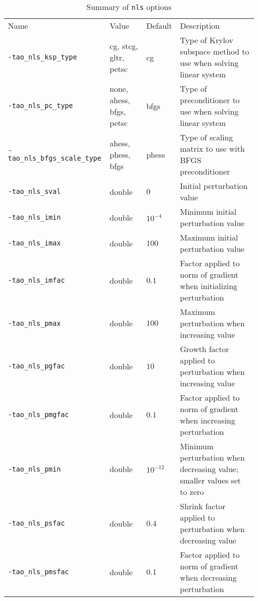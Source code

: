 \begin{table}[h]
\caption{Summary of {\tt nls} options}
\begin{tabular}{l|p{1.5in}|l|p{2.0in}}
Name & Value & Default & Description \\
{\tt -tao\_nls\_ksp\_type} & cg, stcg, gltr, petsc & cg & Type of Krylov subspace method to use when solving linear system \\
{\tt -tao\_nls\_pc\_type} & none, ahess, bfgs, petsc & bfgs & Type of preconditioner to use when solving linear system \\
{\tt -tao\_nls\_bfgs\_scale\_type} & ahess, phess, bfgs & phess & Type of scaling matrix to use with BFGS preconditioner \\
{\tt -tao\_nls\_sval} & double & $0$ & Initial perturbation value \\
{\tt -tao\_nls\_imin} & double & $10^{-4}$ & Minimum initial perturbation value \\
{\tt -tao\_nls\_imax} & double & $100$ & Maximum initial perturbation value \\
{\tt -tao\_nls\_imfac} & double & $0.1$ & Factor applied to norm of gradient when initializing perturbation \\
{\tt -tao\_nls\_pmax} & double & $100$ & Maximum perturbation when increasing value \\
{\tt -tao\_nls\_pgfac} & double & $10$ & Growth factor applied to perturbation when increasing value \\
{\tt -tao\_nls\_pmgfac} & double & $0.1$ & Factor applied to norm of gradient when increasing perturbation \\
{\tt -tao\_nls\_pmin} & double & $10^{-12}$ & Minimum perturbation when decreasing value; smaller values set to zero \\
{\tt -tao\_nls\_psfac} & double & $0.4$ & Shrink factor applied to perturbation when decreasing value \\
{\tt -tao\_nls\_pmsfac} & double & $0.1$ & Factor applied to norm of gradient when decreasing perturbation \\
\end{tabular}
\end{table}

